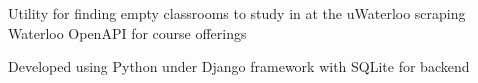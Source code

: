 \begin{minipage}[t]{0.66\textwidth}
        \sectionspace %



        \begin{tightitemize}
                \item Utility for finding empty classrooms to study in at the uWaterloo scraping Waterloo OpenAPI for course offerings
                \item Developed using Python under Django framework with SQLite for backend
        \end{tightitemize}

        \sectionspace %


\end{minipage} %


